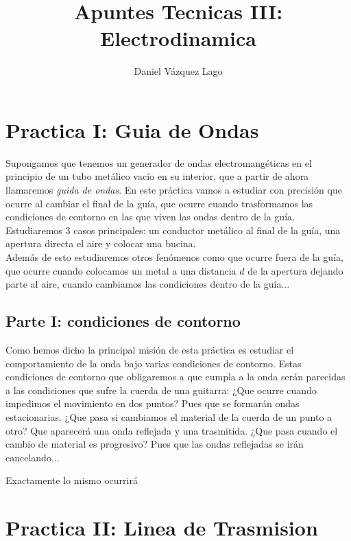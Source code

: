 \documentclass[12pt,a4paper]{article}
\author{Daniel Vázquez Lago}
\title{Apuntes Tecnicas III: Electrodinamica}
\numberwithin{equation}{section}
\numberwithin{figure}{section}
\begin{document}
\maketitle

\newpage

\tableofcontentsa

\newpage

\section{Practica I: Guia de Ondas}

Supongamos que tenemos un generador de ondas electromangéticas en el principio de un tubo metálico vacío en su interior, que a partir de ahora llamaremos \textit{guida de ondas}. En este práctica vamos a estudiar con precisión que ocurre al cambiar el final de la guía, que ocurre cuando trasformamos las condiciones de contorno en las que viven las ondas dentro de la guía. Estudiaremos 3 casos principales: un conductor metálico al final de la guía, una apertura directa el aire y colocar una bucina. \\

Además de esto estudiaremos otros fenómenos como que ocurre fuera de la guía, que ocurre cuando colocamos un metal a una distancia $d$ de la apertura dejando parte al aire, cuando cambiamos las condiciones dentro de la guía...



\subsection{Parte I: condiciones de contorno}

Como hemos dicho la principal misión de esta práctica es estudiar el comportamiento de la onda bajo varias condiciones de contorno. Estas condiciones de contorno que obligaremos a que cumpla a la onda serán parecidas a las condiciones que sufre la cuerda de una guitarra: ¿Que ocurre cuando impedimos el movimiento en dos puntos? Pues que se formarán ondas estacionarias. ¿Que pasa si cambiamos el material de la cuerda de un punto a otro? Que aparecerá una onda reflejada y una trasmitida. ¿Que pasa cuando el cambio de material es progresivo? Pues que las ondas reflejadas se irán cancelando...

Exactamente lo mismo ocurrirá 





\section{Practica II: Linea de Trasmision}
\end{document}
